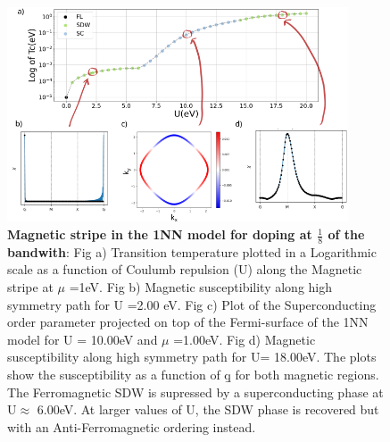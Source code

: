 \documentclass[12pt]{article}
\begin{document}
\begin{figure}[htbp]  %
    \centering
    \includegraphics[width=0.9\textwidth]{1NNstripes.png}  %
    \caption{\textbf{Magnetic stripe in the 1NN model for doping at $\frac{1}{8}$ of the bandwith}: Fig a) Transition temperature plotted in a Logarithmic scale as a function of Coulumb repulsion (U) along the Magnetic stripe at $\mu$ =1eV. 
       Fig b) Magnetic susceptibility along high symmetry path for U =2.00 eV. 
       Fig c) Plot of the Superconducting order parameter projected on top of the Fermi-surface of the 1NN model for U = 10.00eV and $\mu$ =1.00eV.
       Fig d) Magnetic susceptibility along high symmetry path for U= 18.00eV. The plots show the susceptibility as a function of \b{q} for both magnetic regions. The Ferromagnetic SDW is supressed by a superconducting phase at U$\approx$ 6.00eV. At larger values of U,  the SDW phase is recovered but with an Anti-Ferromagnetic ordering instead.  }
    \label{fig:1NN_stripes}
\end{figure}
\end{document}
